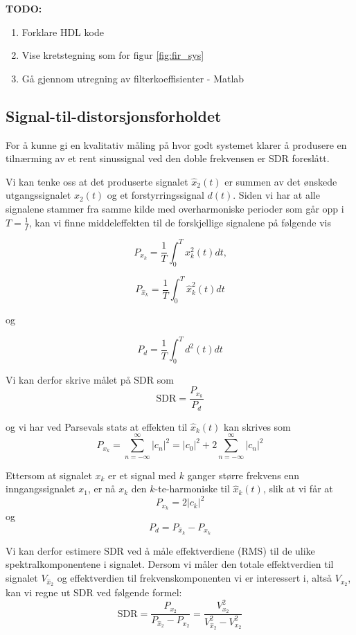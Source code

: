 \begin{tcolorbox}[colback=white, colframe=white!55!black]
    \textbf{TODO:}
    \begin{enumerate}
        \item Forklare HDL kode
        \item Vise kretstegning som for figur \ref{fig:fir_sys}
        \item Gå gjennom utregning av filterkoeffisienter - Matlab
    \end{enumerate}
\end{tcolorbox}


\subsection{Signal-til-distorsjonsforholdet}
For å kunne gi en kvalitativ måling på hvor godt systemet klarer å produsere en tilnærming 
av et rent sinussignal ved den doble frekvensen er SDR foreslått. 

Vi kan tenke oss at det produserte signalet $\hat{x}_2(t)$ er summen av det ønskede utgangssignalet $x_2(t)$
og et forstyrringssignal $d(t)$. Siden vi har at alle signalene stammer fra samme kilde med overharmoniske 
perioder som går opp i $T = \frac{1}{f}$, kan vi finne middeleffekten til de forskjellige signalene på følgende vis

\[
    P_{x_k} = \frac{1}{T} \int_{0}^{T} x_k^2(t)dt \text{,}
\]

\[
    P_{\hat{x}_k} = \frac{1}{T} \int_{0}^{T} \hat{x}_k^2(t)dt
\]

og 

\[
    P_{d} = \frac{1}{T} \int_{0}^{T} d^2(t)dt
\]

Vi kan derfor skrive målet på SDR som 
\[
    \text{SDR} = \frac{P_{x_k}}{P_d}
\]

og vi har ved Parsevals stats at effekten til $\hat{x}_k(t)$ kan skrives som 
\[
    P_{x_k} = \sum_{n=-\infty}^{\infty}|c_n|^2 = |c_0|^2 + 2\sum_{n=-\infty}^{\infty}|c_n|^2
\]

Ettersom at signalet $x_k$ er et signal med $k$ ganger større frekvens enn inngangssignalet $x_1$, er nå 
$x_k$ den $k$-te-harmoniske til $\hat{x}_k(t)$, slik at vi får at 
\[
    P_{x_k} = 2|c_k|^2
\]
og 
\[
    P_d = P_{\hat{x}_k} - P_{x_k}
\]

Vi kan derfor estimere SDR ved å måle effektverdiene (RMS) til de ulike spektralkomponentene i
signalet. Dersom vi måler den totale effektverdien til signalet $V_{\hat{x}_2}$ og 
effektverdien til frekvenskomponenten vi er interessert i, altså $V_{x_2}$, kan vi regne ut SDR ved 
følgende formel:
\[
    \text{SDR} = \frac{P_{x_2}}{P_{\hat{x}_2} - P_{x_2}} = \frac{V_{x_2}^2}{V_{\hat{x}_2}^2 - V_{x_2}^2}
\]

